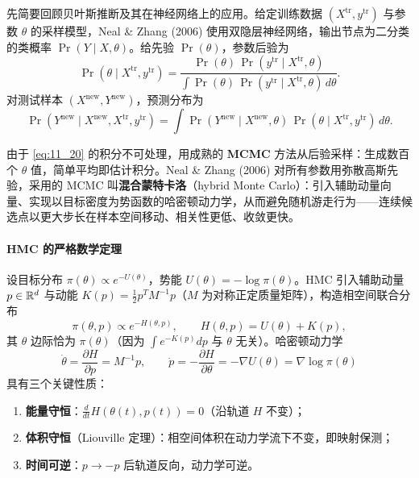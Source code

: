 先简要回顾贝叶斯推断及其在神经网络上的应用。给定训练数据 $(X^{\mathrm{tr}}, y^{\mathrm{tr}})$ 与参数 $\theta$ 的采样模型，Neal \& Zhang (2006) 使用双隐层神经网络，输出节点为二分类的类概率 $\Pr(Y\mid X,\theta)$。给先验 $\Pr(\theta)$，参数后验为
\begin{equation}
\Pr(\theta\mid X^{\mathrm{tr}}, y^{\mathrm{tr}}) = \frac{\Pr(\theta)\, \Pr(y^{\mathrm{tr}}\mid X^{\mathrm{tr}},\theta)}{\int \Pr(\theta)\, \Pr(y^{\mathrm{tr}}\mid X^{\mathrm{tr}},\theta)\, d\theta}. \label{eq:11_19}
\end{equation}
对测试样本 $(X^{\mathrm{new}}, Y^{\mathrm{new}})$，预测分布为
\begin{equation}
\Pr(Y^{\mathrm{new}}\mid X^{\mathrm{new}}, X^{\mathrm{tr}}, y^{\mathrm{tr}}) = \int \Pr(Y^{\mathrm{new}}\mid X^{\mathrm{new}},\theta)\, \Pr(\theta\mid X^{\mathrm{tr}}, y^{\mathrm{tr}})\, d\theta. \label{eq:11_20}
\end{equation}

由于 \ref{eq:11_20} 的积分不可处理，用成熟的 \textbf{MCMC} 方法从后验采样：生成数百个 $\theta$ 值，简单平均即估计积分。Neal \& Zhang (2006) 对所有参数用弥散高斯先验，采用的 MCMC 叫\textbf{混合蒙特卡洛}（hybrid Monte Carlo）：引入辅助动量向量、实现以目标密度为势函数的哈密顿动力学，从而避免随机游走行为——连续候选点以更大步长在样本空间移动、相关性更低、收敛更快。

\paragraph{HMC 的严格数学定理}

设目标分布 $\pi(\theta) \propto e^{-U(\theta)}$，势能 $U(\theta) = -\log\pi(\theta)$。HMC 引入辅助动量 $p\in\mathbb{R}^d$ 与动能 $K(p)=\tfrac12 p^T M^{-1}p$（$M$ 为对称正定质量矩阵），构造相空间联合分布
\[
\pi(\theta,p) \propto e^{-H(\theta,p)}, \qquad H(\theta,p) = U(\theta) + K(p),
\]
其 $\theta$ 边际恰为 $\pi(\theta)$（因为 $\int e^{-K(p)}dp$ 与 $\theta$ 无关）。哈密顿动力学
\[
\dot\theta = \frac{\partial H}{\partial p} = M^{-1}p, \qquad
\dot p = -\frac{\partial H}{\partial \theta} = -\nabla U(\theta) = \nabla\log\pi(\theta)
\]
具有三个关键性质：
\begin{enumerate}
\item \textbf{能量守恒}：$\frac{d}{dt}H(\theta(t),p(t)) = 0$（沿轨道 $H$ 不变）；
\item \textbf{体积守恒}（Liouville 定理）：相空间体积在动力学流下不变，即映射保测；
\item \textbf{时间可逆}：$p\to-p$ 后轨道反向，动力学可逆。
\end{enumerate}

